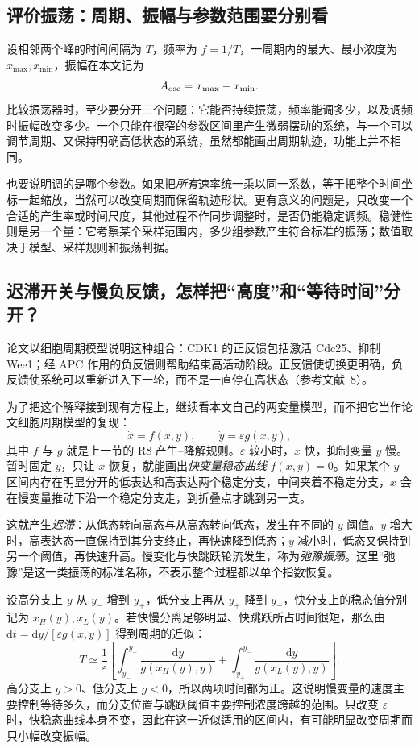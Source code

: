 \documentclass[11pt,a4paper,UTF8,fontset=fandol]{ctexart}
\newcommand{\dd}{\mathrm d}\newcommand{\R}{\mathbb R}\newcommand{\ssv}{\mathrm{ss}}
\begin{document}
\subsection{评价振荡：周期、振幅与参数范围要分别看}
设相邻两个峰的时间间隔为 $T$，频率为 $f=1/T$，一周期内的最大、最小浓度为 $x_{\max},x_{\min}$，振幅在本文记为
\[
A_{\rm osc}=x_{\max}-x_{\min}.
\]
比较振荡器时，至少要分开三个问题：它能否持续振荡，频率能调多少，以及调频时振幅改变多少。一个只能在很窄的参数区间里产生微弱摆动的系统，与一个可以调节周期、又保持明确高低状态的系统，虽然都能画出周期轨迹，功能上并不相同。

也要说明调的是哪个参数。如果把\emph{所有}速率统一乘以同一系数，等于把整个时间坐标一起缩放，当然可以改变周期而保留轨迹形状。更有意义的问题是，只改变一个合适的产生率或时间尺度，其他过程不作同步调整时，是否仍能稳定调频。稳健性则是另一个量：它考察某个采样范围内，多少组参数产生符合标准的振荡；数值取决于模型、采样规则和振荡判据。

\subsection{迟滞开关与慢负反馈，怎样把“高度”和“等待时间”分开？}
论文以细胞周期模型说明这种组合：CDK1 的正反馈包括激活 Cdc25、抑制 Wee1；经 APC 作用的负反馈则帮助结束高活动阶段。正反馈使切换更明确，负反馈使系统可以重新进入下一轮，而不是一直停在高状态（参考文献~8）。

为了把这个解释接到现有方程上，继续看本文自己的两变量模型，而不把它当作论文细胞周期模型的复现：
\[
\dot x=f(x,y),\qquad\dot y=\varepsilon g(x,y),
\]
其中 $f$ 与 $g$ 就是上一节的 R8 产生--降解规则。$\varepsilon$ 较小时，$x$ 快，抑制变量 $y$ 慢。暂时固定 $y$，只让 $x$ 恢复，就能画出\emph{快变量稳态曲线} $f(x,y)=0$。如果某个 $y$ 区间内存在明显分开的低表达和高表达两个稳定分支，中间夹着不稳定分支，$x$ 会在慢变量推动下沿一个稳定分支走，到折叠点才跳到另一支。

这就产生\emph{迟滞}：从低态转向高态与从高态转向低态，发生在不同的 $y$ 阈值。$y$ 增大时，高表达态一直保持到其分支终止，再快速降到低态；$y$ 减小时，低态又保持到另一个阈值，再快速升高。慢变化与快跳跃轮流发生，称为\emph{弛豫振荡}。这里“弛豫”是这一类振荡的标准名称，不表示整个过程都以单个指数恢复。

设高分支上 $y$ 从 $y_-$ 增到 $y_+$，低分支上再从 $y_+$ 降到 $y_-$，快分支上的稳态值分别记为 $x_H(y),x_L(y)$。若快慢分离足够明显、快跳跃所占时间很短，那么由 $\dd t=\dd y/[\varepsilon g(x,y)]$ 得到周期的近似：
\[
T\simeq\frac1\varepsilon\left[
\int_{y_-}^{y_+}\frac{\dd y}{g(x_H(y),y)}+
\int_{y_+}^{y_-}\frac{\dd y}{g(x_L(y),y)}\right].
\]
高分支上 $g>0$、低分支上 $g<0$，所以两项时间都为正。这说明慢变量的速度主要控制等待多久，而分支位置与跳跃阈值主要控制浓度跨越的范围。只改变 $\varepsilon$ 时，快稳态曲线本身不变，因此在这一近似适用的区间内，有可能明显改变周期而只小幅改变振幅。
\end{document}
